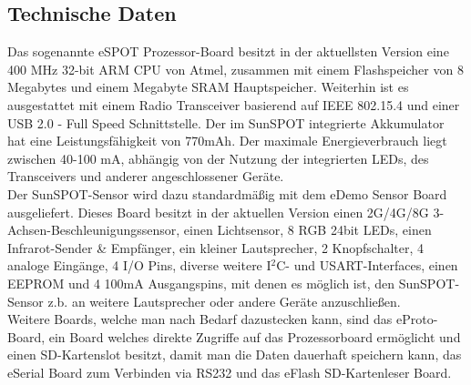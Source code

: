 \subsection{Technische Daten}\label{ss:TechnischeDaten}

Das sogenannte eSPOT Prozessor-Board besitzt in der aktuellsten Version eine 400 MHz 32-bit ARM CPU von Atmel, zusammen mit einem Flashspeicher von 8 Megabytes und einem Megabyte SRAM Hauptspeicher. Weiterhin ist es ausgestattet mit einem Radio Transceiver basierend auf IEEE 802.15.4 und einer USB 2.0 - Full Speed Schnittstelle. Der im SunSPOT integrierte Akkumulator hat eine Leistungsfähigkeit von 770mAh. Der maximale Energieverbrauch liegt zwischen 40-100 mA, abhängig von der Nutzung der integrierten LEDs, des Transceivers und anderer angeschlossener Geräte. \cite{d:horan} \cite{d:spotmain} \\

Der SunSPOT-Sensor wird dazu standardmäßig mit dem eDemo Sensor Board ausgeliefert. Dieses Board besitzt in der aktuellen Version einen 2G/4G/8G 3-Achsen-Beschleunigungssensor, einen Lichtsensor, 8 RGB 24bit LEDs, einen Infrarot-Sender \& Empfänger, ein kleiner Lautsprecher, 2 Knopfschalter, 4 analoge Eingänge, 4 I/O Pins, diverse weitere I$^2$C- und USART-Interfaces, einen EEPROM und 4 100mA Ausgangspins, mit denen es möglich ist, den SunSPOT-Sensor z.b. an weitere Lautsprecher oder andere Geräte anzuschließen. \cite{d:horan} \cite{d:spotdemo} \\

Weitere Boards, welche man nach Bedarf dazustecken kann, sind das eProto-Board, ein Board welches direkte Zugriffe auf das Prozessorboard ermöglicht und einen SD-Kartenslot besitzt, damit man die Daten dauerhaft speichern kann, das eSerial Board zum Verbinden via RS232 und das eFlash SD-Kartenleser Board. \cite{d:horan} \\